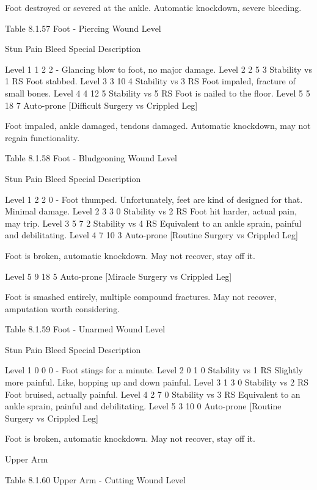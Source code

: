 \documentclass[oneside,11pt,english]{book}
\begin{document}
Foot destroyed or severed at the ankle. Automatic 
knockdown, severe bleeding. 

 
Table 8.1.57 Foot - Piercing 
Wound 
Level 

Stun Pain Bleed Special Description 


Level 1 1 2 2 - Glancing blow to foot, no major damage. 
Level 2 2 5 3 Stability vs 1 RS Foot stabbed. 
Level 3 3 10 4 Stability vs 3 RS Foot impaled, fracture of small bones. 
Level 4 4 12 5 Stability vs 5 RS Foot is nailed to the floor. 
Level 5 5 18 7 Auto-prone 
[Difficult Surgery vs 
Crippled Leg] 

Foot impaled, ankle damaged, tendons damaged. 
Automatic knockdown, may not regain functionality. 

 

 


Table 8.1.58 Foot - Bludgeoning 
Wound 
Level 

Stun Pain Bleed Special Description 

Level 1 2 2 0 - Foot thumped. Unfortunately, feet are kind of designed 
for that. Minimal damage. 
Level 2 3 3 0 Stability vs 2 RS Foot hit harder, actual pain, may trip. 
Level 3 5 7 2 Stability vs 4 RS Equivalent to an ankle sprain, painful and debilitating. 
Level 4 7 10 3 Auto-prone 
[Routine Surgery vs 
Crippled Leg] 

Foot is broken, automatic knockdown. May not recover, 
stay off it. 

Level 5 9 18 5 Auto-prone 
[Miracle Surgery vs 
Crippled Leg] 

Foot is smashed entirely, multiple compound fractures. 
May not recover, amputation worth considering. 

 
Table 8.1.59 Foot - Unarmed 
Wound 
Level 

Stun Pain Bleed Special Description 

Level 1 0 0 0 - Foot stings for a minute. 
Level 2 0 1 0 Stability vs 1 RS Slightly more painful. Like, hopping up and 
down painful. 
Level 3 1 3 0 Stability vs 2 RS Foot bruised, actually painful. 
Level 4 2 7 0 Stability vs 3 RS Equivalent to an ankle sprain, painful and 
debilitating. 
Level 5 3 10 0 Auto-prone 
[Routine Surgery vs 
Crippled Leg] 

Foot is broken, automatic knockdown. May not 
recover, stay off it. 

 

 

Upper Arm 

 
Table 8.1.60 Upper Arm - Cutting 
Wound 
Level 
\end{document}
